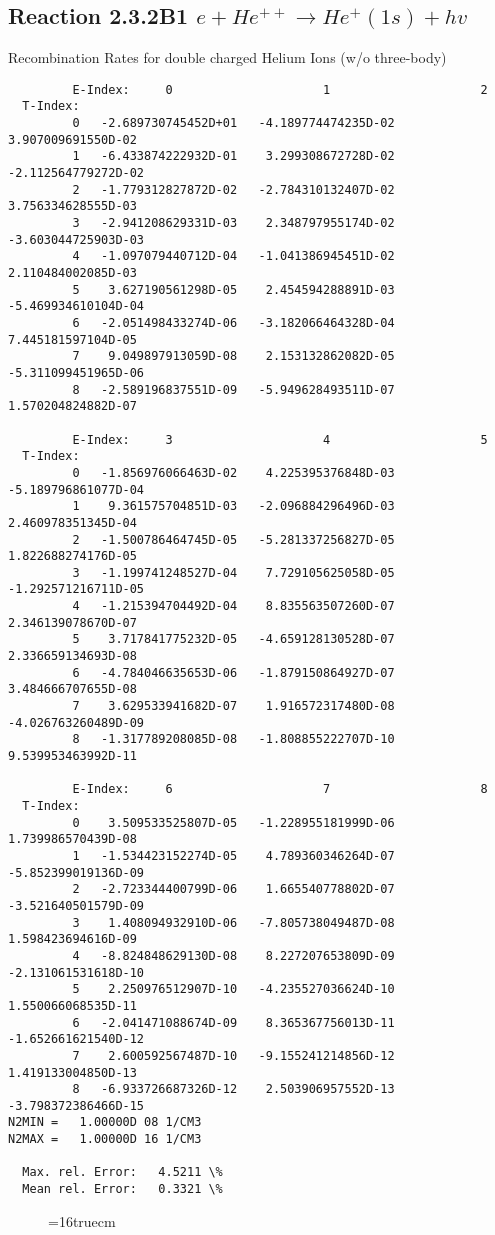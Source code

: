 \documentclass[12pt,dvipdfmx]{article}
\begin{document}
\subsection{
Reaction 2.3.2B1  $e + He^{++} \rightarrow He^+(1s) + hv$
}
  Recombination Rates for double charged Helium Ions (w/o three-body)

\begin{small}\begin{verbatim}
         E-Index:     0                     1                     2
  T-Index:
         0   -2.689730745452D+01   -4.189774474235D-02    3.907009691550D-02
         1   -6.433874222932D-01    3.299308672728D-02   -2.112564779272D-02
         2   -1.779312827872D-02   -2.784310132407D-02    3.756334628555D-03
         3   -2.941208629331D-03    2.348797955174D-02   -3.603044725903D-03
         4   -1.097079440712D-04   -1.041386945451D-02    2.110484002085D-03
         5    3.627190561298D-05    2.454594288891D-03   -5.469934610104D-04
         6   -2.051498433274D-06   -3.182066464328D-04    7.445181597104D-05
         7    9.049897913059D-08    2.153132862082D-05   -5.311099451965D-06
         8   -2.589196837551D-09   -5.949628493511D-07    1.570204824882D-07

         E-Index:     3                     4                     5
  T-Index:
         0   -1.856976066463D-02    4.225395376848D-03   -5.189796861077D-04
         1    9.361575704851D-03   -2.096884296496D-03    2.460978351345D-04
         2   -1.500786464745D-05   -5.281337256827D-05    1.822688274176D-05
         3   -1.199741248527D-04    7.729105625058D-05   -1.292571216711D-05
         4   -1.215394704492D-04    8.835563507260D-07    2.346139078670D-07
         5    3.717841775232D-05   -4.659128130528D-07    2.336659134693D-08
         6   -4.784046635653D-06   -1.879150864927D-07    3.484666707655D-08
         7    3.629533941682D-07    1.916572317480D-08   -4.026763260489D-09
         8   -1.317789208085D-08   -1.808855222707D-10    9.539953463992D-11

         E-Index:     6                     7                     8
  T-Index:
         0    3.509533525807D-05   -1.228955181999D-06    1.739986570439D-08
         1   -1.534423152274D-05    4.789360346264D-07   -5.852399019136D-09
         2   -2.723344400799D-06    1.665540778802D-07   -3.521640501579D-09
         3    1.408094932910D-06   -7.805738049487D-08    1.598423694616D-09
         4   -8.824848629130D-08    8.227207653809D-09   -2.131061531618D-10
         5    2.250976512907D-10   -4.235527036624D-10    1.550066068535D-11
         6   -2.041471088674D-09    8.365367756013D-11   -1.652661621540D-12
         7    2.600592567487D-10   -9.155241214856D-12    1.419133004850D-13
         8   -6.933726687326D-12    2.503906957552D-13   -3.798372386466D-15
N2MIN =   1.00000D 08 1/CM3
N2MAX =   1.00000D 16 1/CM3

  Max. rel. Error:   4.5211 \%
  Mean rel. Error:   0.3321 \%

\end{verbatim}\end{small}
\begin{figure} \label{2.3.2B1}
\epsfxsize=16truecm
\end{figure}
\newpage
\end{document}
